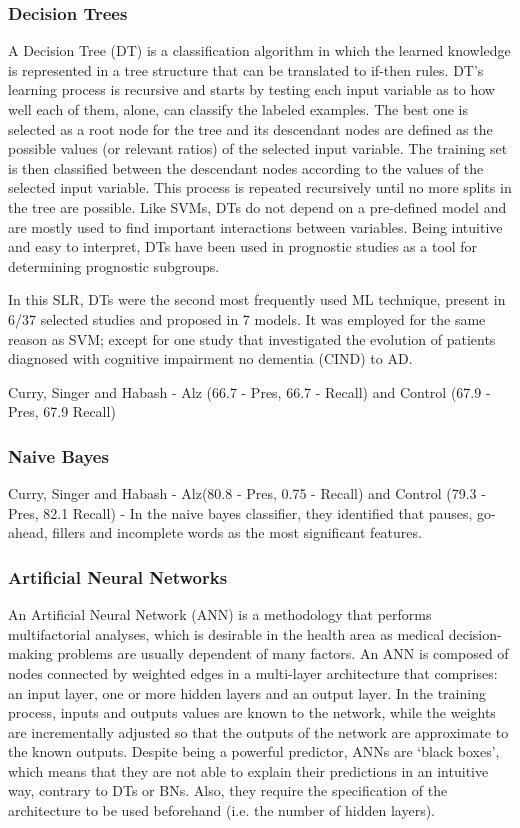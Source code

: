 \documentclass[10pt, letterpaper, twoside, openany]{thesis}
\begin{document}
\subsubsection{Decision Trees}
A Decision Tree (DT) is a classification algorithm in which the learned knowledge is represented in a tree structure that can be translated to if-then rules. DT's learning process is recursive and starts by testing each input variable as to how well each of them, alone, can classify the labeled examples. The best one is selected as a root node for the tree and its descendant nodes are defined as the possible values (or relevant ratios) of the selected input variable. The training set is then classified between the descendant nodes according to the values of the selected input variable. This process is repeated recursively until no more splits in the tree are possible. Like SVMs, DTs do not depend on a pre-defined model and are mostly used to find important interactions between variables. Being intuitive and easy to interpret, DTs have been used in prognostic studies as a tool for determining prognostic subgroups.
\par 
In this SLR, DTs were the second most frequently used ML technique, present in 6/37 selected studies and proposed in 7 models. It was employed for the same reason as SVM; except for one study that investigated the evolution of patients diagnosed with cognitive impairment no dementia (CIND) to AD.


Curry, Singer and Habash - Alz (66.7 - Pres, 66.7 - Recall) and Control (67.9 - Pres, 67.9 Recall)

\subsubsection{Naive Bayes}

Curry, Singer and Habash - Alz(80.8 - Pres, 0.75 - Recall) and Control (79.3 - Pres, 82.1 Recall) - In the naive bayes classifier, they identified that pauses, go-ahead, fillers and incomplete words as the most significant features.  %

\subsubsection{Artificial Neural Networks}
An Artificial Neural Network (ANN) is a methodology that performs multifactorial analyses, which is desirable in the health area as medical decision-making problems are usually dependent of many factors. An ANN is composed of nodes connected by weighted edges in a multi-layer architecture that comprises: an input layer, one or more hidden layers and an output layer. In the training process, inputs and outputs values are known to the network, while the weights are incrementally adjusted so that the outputs of the network are approximate to the known outputs. Despite being a powerful predictor, ANNs are `black boxes', which means that they are not able to explain their predictions in an intuitive way, contrary to DTs or BNs. Also, they require the specification of the architecture to be used beforehand (i.e. the number of hidden layers).
\end{document}
